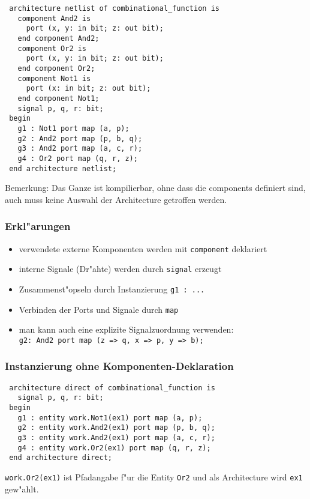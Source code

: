 \documentclass[german, 10pt, a4paper, twocolumn]{scrartcl}
\theoremstyle{definition}
\begin{document}
\begin{verbatim}
 architecture netlist of combinational_function is
   component And2 is
     port (x, y: in bit; z: out bit);
   end component And2;
   component Or2 is
     port (x, y: in bit; z: out bit);
   end component Or2;
   component Not1 is
     port (x: in bit; z: out bit);
   end component Not1;
   signal p, q, r: bit;
 begin
   g1 : Not1 port map (a, p);
   g2 : And2 port map (p, b, q);
   g3 : And2 port map (a, c, r);
   g4 : Or2 port map (q, r, z);
 end architecture netlist;
\end{verbatim}

Bemerkung: Das Ganze ist kompilierbar, ohne dass die components definiert sind, auch muss keine Auswahl der Architecture getroffen werden.

\subsubsection{Erkl"arungen}

\begin{itemize}
	\item verwendete externe Komponenten werden mit \texttt{component} deklariert
	\item interne Signale (Dr"ahte) werden durch \texttt{signal} erzeugt
	\item Zusammenst"opseln durch Instanzierung \texttt{g1 : ...}
	\item Verbinden der Ports und Signale durch \texttt{map}
	\item man kann auch eine explizite Signalzuordnung verwenden:\\
		\verb#g2: And2 port map (z => q, x => p, y => b);#
\end{itemize}


\subsubsection{Instanzierung ohne Komponenten-Deklaration}

\begin{verbatim}
 architecture direct of combinational_function is
   signal p, q, r: bit;
 begin
   g1 : entity work.Not1(ex1) port map (a, p);
   g2 : entity work.And2(ex1) port map (p, b, q);
   g3 : entity work.And2(ex1) port map (a, c, r);
   g4 : entity work.Or2(ex1) port map (q, r, z);
 end architecture direct;
\end{verbatim}

\texttt{work.Or2(ex1)} ist Pfadangabe f"ur die Entity \texttt{Or2} und als Architecture wird \texttt{ex1} gew"ahlt.
\end{document}
